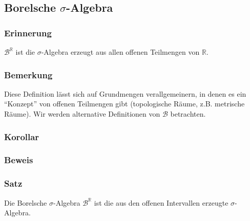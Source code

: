 \subsection{Borelsche $\sigma$-Algebra}
\subsubsection{Erinnerung}
$\mathcal{B}^\mathbb{R}$ ist die $\sigma$-Algebra erzeugt aus allen offenen Teilmengen von $\mathbb{R}$.
\subsubsection{Bemerkung}
Diese Definition l\"asst sich auf Grundmengen verallgemeinern, in denen es ein ``Konzept'' von offenen Teilmengen gibt (topologische R\"aume, z.B. metrische R\"aume). Wir werden alternative Definitionen von $\mathcal{B}$ betrachten.
\subsubsection{Korollar}
\subsubsection{Beweis}
\subsubsection{Satz}
Die Borelsche $\sigma$-Algebra $\mathcal{B}^\mathbb{R}$ ist die aus den offenen Intervallen erzeugte $\sigma$-Algebra.
